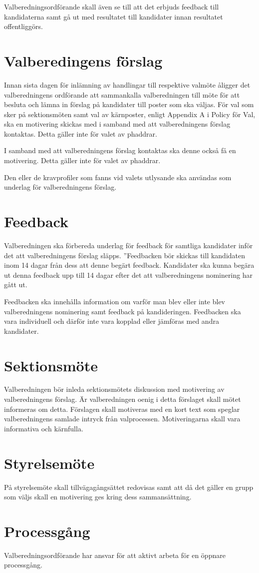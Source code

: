 \documentclass{dsekprotokoll}
\begin{document}
Valberedningsordförande skall även se till att det erbjuds feedback
till kandidaterna samt gå
ut med resultatet till kandidater innan resultatet offentliggörs.

\section{Valberedingens förslag}
Innan sista dagen för inlämning av handlingar till respektive valmöte
åligger det valberedningens ordförande att sammankalla valberedningen
till möte för att besluta och lämna in förslag
på kandidater till poster som ska väljas. För val som sker på
sektionsmöten samt val av kärnposter, enligt Appendix A i Policy för
Val, ska en motivering skickas med i samband med
att valberedningens förslag kontaktas. Detta gäller inte för
valet av phaddrar.

I samband med att valberedningens förslag kontaktas ska denne också
få en motivering.
Detta gäller inte för valet av phaddrar.

Den eller de kravprofiler som fanns vid valets utlysande ska användas
som underlag för
valberedningens förslag.

\section{Feedback}
Valberedningen ska förbereda underlag för feedback för samtliga
kandidater inför det att
valberedningens förslag släpps. ”Feedbacken bör skickas till
kandidaten inom 14 dagar från dess att denne begärt feedback.
Kandidater ska kunna begära ut denna feedback upp till 14 dagar efter
det att valberedningens nominering har gått ut.

Feedbacken ska innehålla information om varför man blev eller inte
blev valberedningens nominering samt feedback på kandideringen.
Feedbacken ska vara individuell och därför inte vara kopplad eller
jämföras med andra kandidater.

\section{Sektionsmöte}
Valberedningen bör inleda sektionsmötets diskussion med motivering av
valberedningens förslag. Är valberedningen oenig i detta förslaget
skall mötet informeras om detta. Förslagen skall
motiveras med en kort text som speglar valberedningens samlade
intryck från valprocessen. Motiveringarna skall vara informativa och kärnfulla.

\section{Styrelsemöte}
På styrelsemöte skall tillvägagångsättet redovisas samt att då det
gäller en grupp som väljs skall
en motivering ges kring dess sammansättning.

\section{Processgång}
Valberedningsordförande har ansvar för att aktivt arbeta för en
öppnare processgång.
\end{document}
